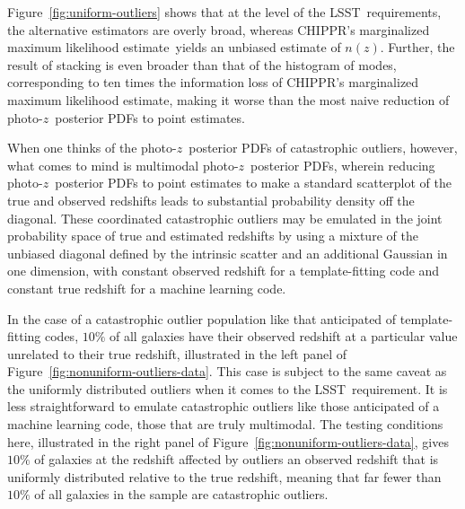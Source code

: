 \documentclass[iop]{emulateapj}
\newcommand{\Fig}[1]{Figure~\ref{#1}}
\newcommand{\project}[1]{\textsc{#1}}
\newcommand{\lsst}{\project{LSST}}
\newcommand{\Chippr}{\project{CHIPPR}}%
\newcommand{\pz}{photo-$z$}
\newcommand{\pzpdf}{\pz\ posterior PDF}%
\newcommand{\nz}{$n(z)$}
\newcommand{\mmle}{marginalized maximum likelihood estimate}%
\begin{document}
\Fig{fig:uniform-outliers} shows that at the level of the \lsst\ requirements, the alternative estimators are overly broad, whereas \Chippr's \mmle\ yields an unbiased estimate of \nz.
Further, the result of stacking is even broader than that of the histogram of modes, corresponding to ten times the information loss of \Chippr's \mmle, making it worse than the most naive reduction of \pzpdf s to point estimates.

When one thinks of the \pzpdf s of catastrophic outliers, however, what comes to mind is multimodal \pzpdf s, wherein reducing \pzpdf s to point estimates to make a standard scatterplot of the true and observed redshifts leads to substantial probability density off the diagonal.
These coordinated catastrophic outliers may be emulated in the joint probability space of true and estimated redshifts by using a mixture of the unbiased diagonal defined by the intrinsic scatter and an additional Gaussian in one dimension, with constant observed redshift for a template-fitting code and constant true redshift for a machine learning code.

In the case of a catastrophic outlier population like that anticipated of template-fitting codes, $10\%$ of all galaxies have their observed redshift at a particular value unrelated to their true redshift, illustrated in the left panel of \Fig{fig:nonuniform-outliers-data}.
This case is subject to the same caveat as the uniformly distributed outliers when it comes to the \lsst\ requirement.
It is less straightforward to emulate catastrophic outliers like those anticipated of a machine learning code, those that are truly multimodal.
The testing conditions here, illustrated in the right panel of \Fig{fig:nonuniform-outliers-data}, gives $10\%$ of galaxies at the redshift affected by outliers an observed redshift that is uniformly distributed relative to the true redshift, meaning that far fewer than $10\%$ of all galaxies in the sample are catastrophic outliers.
\end{document}
